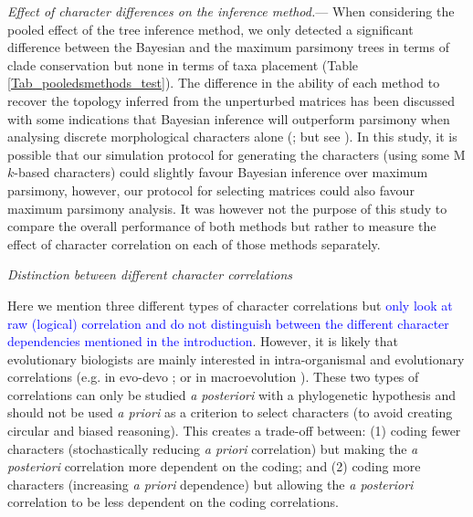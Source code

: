 \documentclass[12pt,letterpaper]{article}
\renewcommand{\subsection}[1]{%
\bigskip
\begin{center}
\begin{large}
\normalfont\itshape #1
\end{large}
\end{center}}
\renewcommand{\subsubsection}[1]{%
\vspace{2ex}
\noindent
\textit{#1.}---}
\begin{document}
\subsubsection{Effect of character differences on the inference method}
When considering the pooled effect of the tree inference method, we only detected a significant difference between the Bayesian and the maximum parsimony trees in terms of clade conservation but none in terms of taxa placement (Table \ref{Tab_pooledsmethods_test}).
The difference in the ability of each method to recover the topology inferred from the unperturbed matrices has been discussed with some indications that Bayesian inference will outperform parsimony when analysing discrete morphological characters alone (\citealt{wrightbayesian2014,OReilly20160081,puttick2017uncertain}; but see \citealt{spencerefficacy2013,goloboff2017weighted}).
In this study, it is possible that our simulation protocol for generating the characters (using some M$k$-based characters) could slightly favour Bayesian inference over maximum parsimony, however, our protocol for selecting matrices \citep[using matrices with a $CI>0.26$;][]{OReilly20160081} could also favour maximum parsimony analysis.
It was however not the purpose of this study to compare the overall performance of both methods but rather to measure the effect of character correlation on each of those methods separately.

\subsection{Distinction between different character correlations}
Here we mention three different types of character correlations but \textcolor{blue}{only look at raw (logical) correlation and do not distinguish between the different character dependencies mentioned in the introduction}.
However, it is likely that evolutionary biologists are mainly interested in intra-organismal and evolutionary correlations (e.g. in evo-devo \citealt{goswami2006morphological}; or in macroevolution \citealt{fitzjohn2014much}).
These two types of correlations can only be studied \textit{a posteriori} with a phylogenetic hypothesis and should not be used \textit{a priori} as a criterion to select characters (to avoid creating circular and biased reasoning).
This creates a trade-off between: (1) coding fewer characters (stochastically reducing \textit{a priori} correlation) but making the \textit{a posteriori} correlation more dependent on the coding;
and (2) coding more characters (increasing \textit{a priori} dependence) but allowing the \textit{a posteriori} correlation to be less dependent on the coding correlations.
\end{document}
